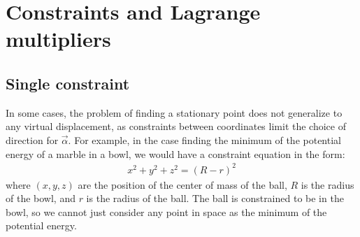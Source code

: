 \section{Constraints and Lagrange multipliers}
\subsection{Single constraint}
In some cases, the problem of finding a stationary point does not generalize to any virtual displacement, as constraints between coordinates limit the choice of direction for $\vec{\alpha}$. For example, in the case finding the minimum of the potential energy of a marble in a bowl, we would have a constraint equation in the form:
\begin{align}
x^2+y^2+z^2=(R-r)^2
\end{align}
where $(x,y,z)$ are the position of the center of mass of the ball, $R$ is the radius of the bowl, and $r$ is the radius of the ball. The ball is constrained to be in the bowl, so we cannot just consider any point in space as the minimum of the potential energy.


